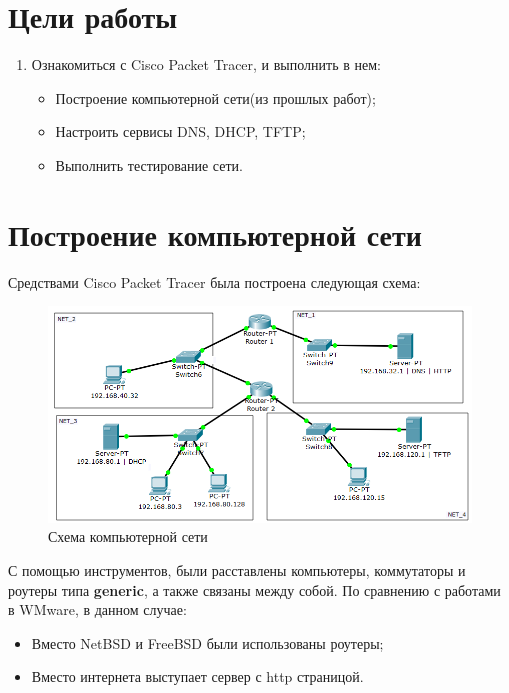 \documentclass[a4paper, 12pt]{article}		%
\begin{document}


%
\section{Цели работы}
\begin{enumerate}
\item Ознакомиться с Cisco Packet Tracer, и выполнить в нем:
\begin{itemize}
\item Построение компьютерной сети(из прошлых работ);
\item Настроить сервисы DNS, DHCP, TFTP;
\item Выполнить тестирование сети.
\end{itemize}
\end{enumerate}

\section{Построение компьютерной сети}
Средствами Cisco Packet Tracer была построена следующая схема:
\begin{figure}[H]
  \centering
  \includegraphics[width=\textwidth]{img/my_kks}
  \caption{Схема компьютерной сети}
\end{figure}
С помощью инструментов, были расставлены компьютеры, коммутаторы и роутеры типа \textbf{generic}, а также связаны между собой. По сравнению с работами в WMware, в данном случае:
\begin{itemize}
\item Вместо NetBSD и FreeBSD были использованы роутеры;
\item Вместо интернета выступает сервер с http страницой.
\end{itemize}
\end{document}

